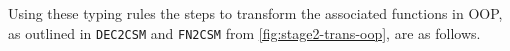 \documentclass[ oneside,%
                    author={James Elgar},
                    degree={MEng},
                     title={Bidirectional transformer between functional and \\ object-oriented programming in Rust},
                  subtitle={}]{dissertation}
\begin{document}



Using these typing rules the steps to transform the associated functions in OOP, as outlined in \verb|DEC2CSM| and \verb|FN2CSM| from \autoref{fig:stage2-trans-oop}, are as follows.
\end{document}
